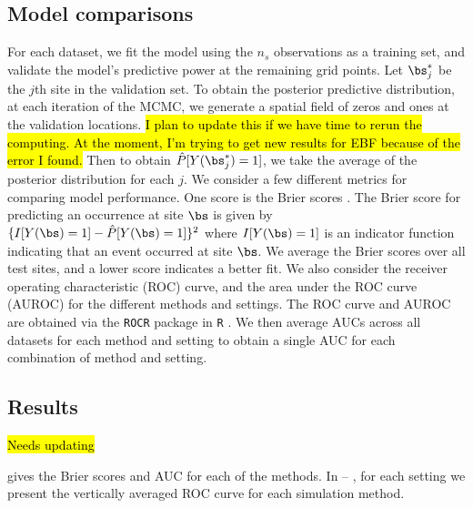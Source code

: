 \subsection{Model comparisons}\label{rbs:cv}
For each dataset, we fit the model using the $n_s$ observations as a training set, and validate the model's predictive power at the remaining grid points.
Let $\bs^*_j$ be the $j$th site in the validation set.
To obtain the posterior predictive distribution, at each iteration of the MCMC, we generate a spatial field of zeros and ones at the validation locations.
\hl{I plan to update this if we have time to rerun the computing. At the moment, I'm trying to get new results for EBF because of the error I found.}
Then to obtain $\hat{P}[Y(\bs^*_j) = 1]$, we take the average of the posterior distribution for each $j$.
We consider a few different metrics for comparing model performance.
One score is the Brier scores \citep[BS]{Gneiting2007}.
The Brier score for predicting an occurrence at site $\bs$ is given by $\{I[Y(\bs)=1] - \hat{P}[Y(\bs)=1]\}^2$ where $I[Y(\bs) = 1]$ is an indicator function indicating that an event occurred at site $\bs$.
We average the Brier scores over all test sites, and a lower score indicates a better fit.
We also consider the receiver operating characteristic (ROC) curve, and the area under the ROC curve (AUROC) for the different methods and settings.
The ROC curve and AUROC are obtained via the \texttt{ROCR} \citep{Sing2005} package in \texttt{R} \citep{Rmanual}.
We then average AUCs across all datasets for each method and setting to obtain a single AUC for each combination of method and setting.

\subsection{Results} \label{rbs:simresults}
\hl{Needs updating}

 gives the Brier scores and AUC for each of the methods.
In  -- , for each setting we present the vertically averaged ROC curve for each simulation method.


